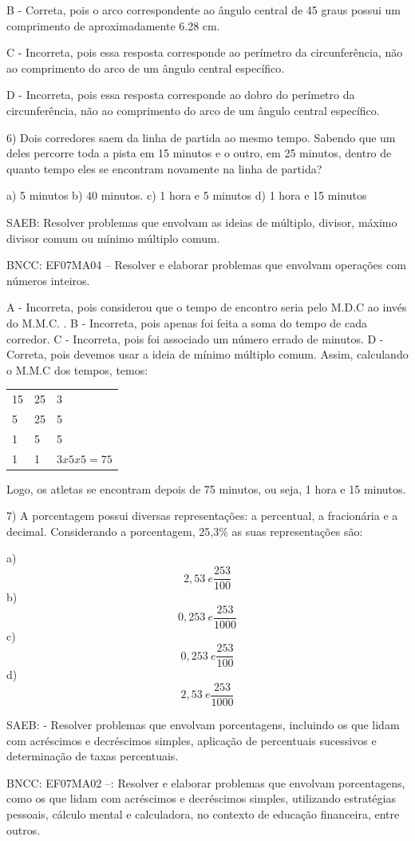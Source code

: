 B - Correta, pois o arco correspondente ao ângulo central de 45 graus
possui um comprimento de aproximadamente 6.28 cm.

C - Incorreta, pois essa resposta corresponde ao perímetro da
circunferência, não ao comprimento do arco de um ângulo central
específico.

D - Incorreta, pois essa resposta corresponde ao dobro do perímetro da
circunferência, não ao comprimento do arco de um ângulo central
específico.

6) Dois corredores saem da linha de partida ao mesmo tempo. Sabendo que
um deles percorre toda a pista em 15 minutos e o outro, em 25 minutos,
dentro de quanto tempo eles se encontram novamente na linha de partida?

a) 5 minutos b) 40 minutos. c) 1 hora e 5 minutos d) 1 hora e 15 minutos

SAEB: Resolver problemas que envolvam as ideias de múltiplo, divisor,
máximo divisor comum ou mínimo múltiplo comum.

BNCC: EF07MA04 -- Resolver e elaborar problemas que envolvam operações
com números inteiros.

A - Incorreta, pois considerou que o tempo de encontro seria pelo M.D.C
ao invés do M.M.C. . B - Incorreta, pois apenas foi feita a soma do
tempo de cada corredor. C - Incorreta, pois foi associado um número
errado de minutos. D - Correta, pois devemos usar a ideia de mínimo
múltiplo comum. Assim, calculando o M.M.C dos tempos, temos:

\begin{longtable}[]{@{}lll@{}}
\toprule
\endhead
15 & 25 & 3\tabularnewline
5 & 25 & 5\tabularnewline
1 & 5 & 5\tabularnewline
1 & 1 & \(3x5x5 = 75\)\tabularnewline
\bottomrule
\end{longtable}

Logo, os atletas se encontram depois de 75 minutos, ou seja, 1 hora e 15
minutos.

7) A porcentagem possui diversas representações: a percentual, a
fracionária e a decimal. Considerando a porcentagem, 25,3\% as suas
representações são:

a) \[2,53\ e\frac{253}{100}\] b) \[0,253\ e\frac{253}{1000}\] c)
\[0,253\ e\frac{253}{100}\] d) \[2,53\ e\frac{253}{1000}\]

SAEB: - Resolver problemas que envolvam porcentagens, incluindo os que
lidam com acréscimos e decréscimos simples, aplicação de percentuais
sucessivos e determinação de taxas percentuais.

BNCC: EF07MA02 --: Resolver e elaborar problemas que envolvam
porcentagens, como os que lidam com acréscimos e decréscimos simples,
utilizando estratégias pessoais, cálculo mental e calculadora, no
contexto de educação financeira, entre outros.

